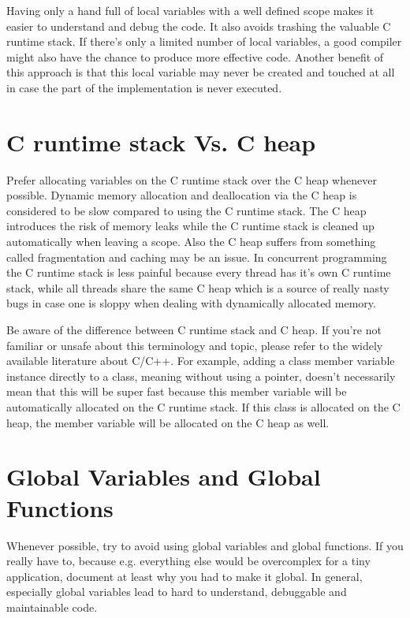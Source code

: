 Having only a hand full of local variables with a well defined scope makes it easier to understand and debug the code. It also avoids trashing the valuable C runtime stack. If there's only a limited number of local variables, a good compiler might also have the chance to produce more effective code. Another benefit of this approach is that this local variable may never be created and touched at all in case the part of the implementation is never executed.




\section{C runtime stack Vs. C heap}
Prefer allocating variables on the C runtime stack over the C heap whenever possible. Dynamic memory allocation and deallocation via the C heap is considered to be slow compared to using the C runtime stack. The C heap introduces the risk of memory leaks while the C runtime stack is cleaned up automatically when leaving a scope. Also the C heap suffers from something called fragmentation and caching may be an issue. In concurrent programming the C runtime stack is less painful because every thread has it's own C runtime stack, while all threads share the same C heap which is a source of really nasty bugs in case one is sloppy when dealing with dynamically allocated memory.

Be aware of the difference between C runtime stack and C heap. If you're not familiar or unsafe about this terminology and topic, please refer to the widely available literature about C/C++. For example, adding a class member variable instance directly to a class, meaning without using a pointer, doesn't necessarily mean that this will be super fast because this member variable will be automatically allocated on the C runtime stack. If this class is allocated on the C heap, the member variable will be allocated on the C heap as well.




\section{Global Variables and Global Functions}
Whenever possible, try to avoid using global variables and global functions. If you really have to, because e.g. everything else would be overcomplex for a tiny application, document at least why you had to make it global. In general, especially global variables lead to hard to understand, debuggable and maintainable code.




